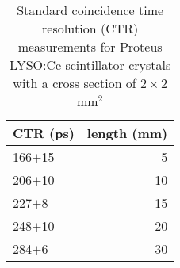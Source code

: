 \begin{table}
\caption{\label{tab:standardctr} Standard coincidence time resolution (CTR) measurements for Proteus LYSO:Ce scintillator crystals with a cross section of $2\times2$mm$^2$}
\begin{tabular}{lr}
\hline
        CTR (ps) &  length (mm) \\
\hline
 166$\pm$15 &       5 \\
 206$\pm$10 &      10 \\
  227$\pm$8 &      15 \\
 248$\pm$10 &      20 \\
  284$\pm$6 &      30 \\
\hline
\end{tabular}
\end{table}